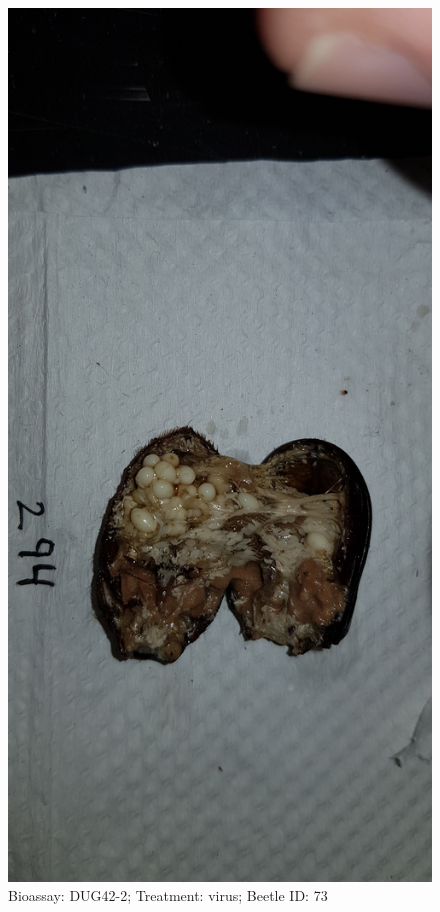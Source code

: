 \documentclass[11pt]{scrartcl}
\begin{document}
\begin{figure}[h!]
    \centering
    \includegraphics[width=\linewidth, height=\textheight, keepaspectratio]{uploads/btl.pm_image.93628d405386753a.4475673432203239345f7265702d322076697275732e6a7067.jpg}
    \caption{Bioassay: DUG42-2; Treatment: virus; Beetle ID: 73}
\end{figure}
\clearpage
\end{document}
